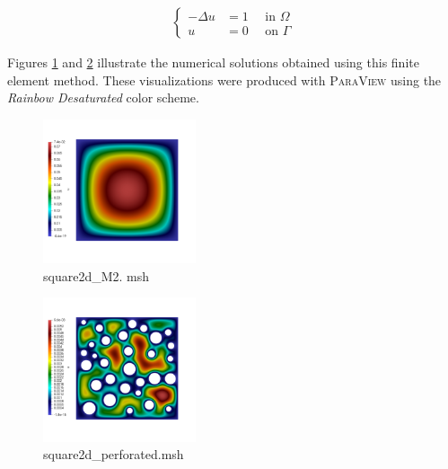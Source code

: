\documentclass[english,10pt,a4paper]{article}
\begin{document}
\begin{eqnarray*}
\left\{
  \begin{aligned}
    - \Delta u &= 1 \quad \text{ in } \Omega \\
    u &= 0 \quad \text{ on } \Gamma
  \end{aligned}
  \right.
\end{eqnarray*}

Figures \ref{fig:res_square2d_M2} and \ref{fig:res_square2d_perforated} illustrate the numerical solutions obtained using this finite element method.
These visualizations were produced with \textsc{ParaView} using the \textit{Rainbow Desaturated} color scheme.

\begin{multicols}{2}
  \begin{figure}[H]
  \centering
  \includegraphics[width=0.4\textwidth]{images/resultat_f1_nonperfo.png}
  \caption{square2d\_M2. msh}
  \label{fig:res_square2d_M2}
  \end{figure}
  \columnbreak
  \begin{figure}[H]
  \centering
  \includegraphics[width=0.4\textwidth]{images/resultat_f1_perfo.png}
  \caption{square2d\_perforated.msh}
  \label{fig:res_square2d_perforated}
  \end{figure}
\end{multicols}


\end{document}
